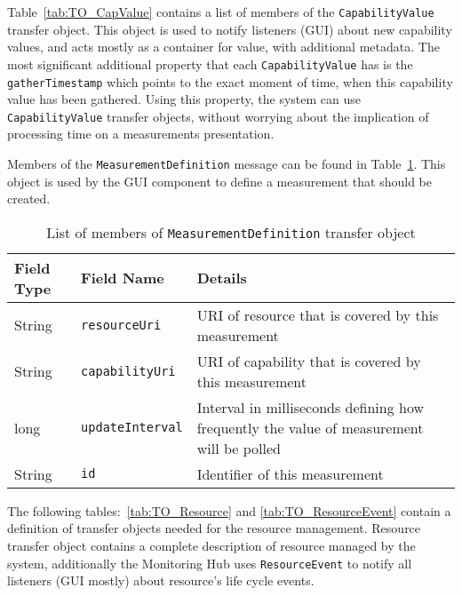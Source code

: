 Table~\ref{tab:TO_CapValue} contains a list of members of the \texttt{CapabilityValue} transfer object. This object is used to notify listeners (GUI) about new capability values, and acts mostly as a container for value, with additional metadata. The most significant additional property that each \texttt{CapabilityValue} has is the \texttt{gatherTimestamp} which points to the exact moment of time, when this capability value has been gathered. Using this property, the system can use \texttt{CapabilityValue} transfer objects, without worrying about the implication of processing time on a measurements presentation.

Members of the \texttt{MeasurementDefinition} message can be found in Table~\ref{tab:TO_MeasurementDef}. This object is used by the GUI component to define a measurement that should be created.

\begin{table}[ht] %
\begin{tabular}{| m{} | m{} | m{} |}
\hline 
\cellcolor[gray]{0.9} Field Type & \cellcolor[gray]{0.9} Field Name & \cellcolor[gray]{0.9} Details \\
\hline 
String & \texttt{resourceUri} & URI of resource that is covered by this measurement \\
String & \texttt{capabilityUri} & URI of capability that is covered by this measurement \\
long & \texttt{updateInterval} & Interval in milliseconds defining how frequently the value of measurement will be polled \\
String & \texttt{id} & Identifier of this measurement \\ 
\hline 
\end{tabular}
\caption{List of members of \texttt{MeasurementDefinition} transfer object}
\label{tab:TO_MeasurementDef}
\end{table} %

The following tables:~\ref{tab:TO_Resource} and \ref{tab:TO_ResourceEvent} contain a definition of transfer objects needed for the resource management. Resource transfer object contains a complete description of resource managed by the system, additionally the Monitoring Hub uses \texttt{ResourceEvent} to notify all listeners (GUI mostly) about resource's life cycle events. 

